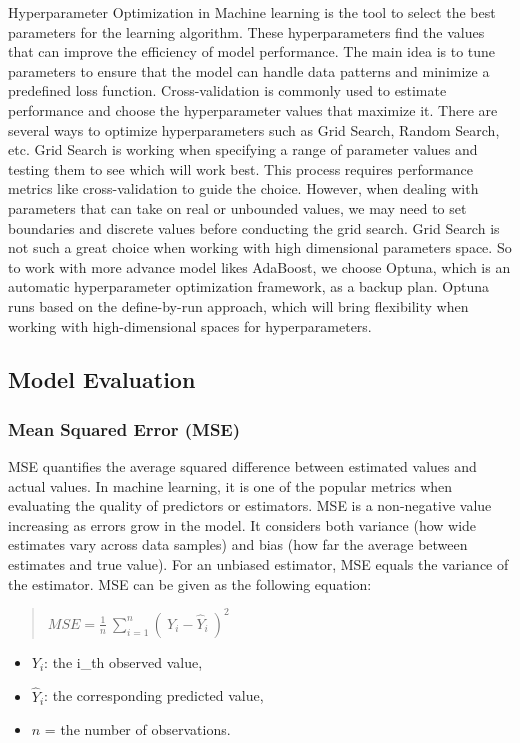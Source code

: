 Hyperparameter Optimization in Machine learning is the tool to select the best parameters for the learning algorithm. These hyperparameters find the values that can improve the efficiency of model performance. The main idea is to tune parameters to ensure that the model can handle data patterns and minimize a predefined loss function. Cross-validation is commonly used to estimate performance and choose the hyperparameter values that maximize it. There are several ways to optimize hyperparameters such as Grid Search, Random Search, etc. Grid Search is working when specifying a range of parameter values and testing them to see which will work best. This process requires performance metrics like cross-validation to guide the choice. However, when dealing with parameters that can take on real or unbounded values, we may need to set boundaries and discrete values before conducting the grid search. Grid Search is not such a great choice when working with high dimensional parameters space. So to work with more advance model likes AdaBoost, we choose Optuna\cite{optuna}, which is an automatic hyperparameter optimization framework, as a backup plan. Optuna runs based on the define-by-run approach, which will bring flexibility when working with high-dimensional spaces for hyperparameters. 

\subsection{Model Evaluation}

\subsubsection{Mean Squared Error (MSE)}
MSE quantifies the average squared difference between estimated values and actual values. In machine learning, it is one of the popular metrics when evaluating the quality of predictors or estimators. MSE is a non-negative value increasing as errors grow in the model. It considers both variance (how wide estimates vary across data samples) and bias (how far the average between estimates and true value). For an unbiased estimator, MSE equals the variance of the estimator. MSE can be given as the following equation:
\begin{quote}
    
    \(MSE = \frac{1}{n}\ \sum_{i=1}^{n}({\ Y}_{i} - {\widehat{Y}}_{i}\ )^2\)
\end{quote}

\begin{itemize}
    \item \(Y_{i}\): the i\_th observed value,
    \item \({\widehat{Y}}_{i}\): the corresponding predicted value,
    \item \(n\) = the number of observations.
\end{itemize}

